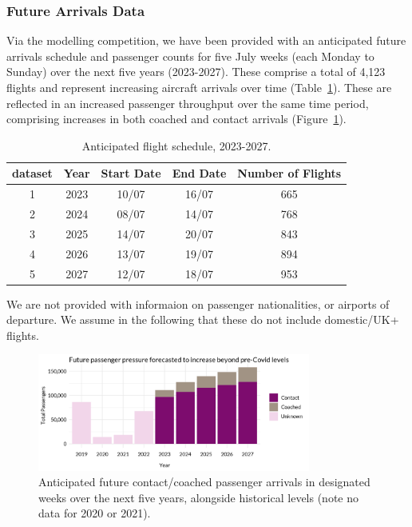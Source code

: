 \documentclass[10pt]{article}
\begin{document}
\subsubsection{Future Arrivals Data} \label{sec:future_arrivals_data}
Via the modelling competition, we have been provided with an anticipated future arrivals schedule and passenger counts for five July weeks (each Monday to Sunday) over the next five years (2023-2027). These comprise a total of 4,123 flights and represent increasing aircraft arrivals over time (Table~\ref{tab:future_arrivals_overview}). These are reflected in an increased passenger throughput over the same time period, comprising increases in both coached and contact arrivals (Figure~\ref{fig:future_passenger_burden}).
\begin{table}[!ht]
\caption{Anticipated flight schedule, 2023-2027.}
\label{tab:future_arrivals_overview}
\centering
\begin{tabular}{ccccc}
\hline
\multicolumn{1}{c}{\textbf{dataset}} & \textbf{Year} & \textbf{Start Date} & \textbf{End Date} & \textbf{Number of Flights} \\ \hline
1  & 2023  & 10/07  & 16/07     & 665   \\
2  & 2024  & 08/07  & 14/07     & 768   \\
3  & 2025  & 14/07  & 20/07     & 843   \\
4  & 2026  & 13/07  & 19/07     & 894   \\
5  & 2027  & 12/07  & 18/07     & 953   \\ \hline
\end{tabular}
\end{table}
We are not provided with informaion on passenger nationalities, or airports of departure. We assume in the following that these do not include domestic/UK+ flights. 

\begin{figure}[!ht]
    \centering
    \includegraphics[width=0.8\textwidth]{figures/future_passenger_burden_fig.png}
     \caption{Anticipated future contact/coached passenger arrivals in designated weeks over the next five years, alongside historical levels (note no data for 2020 or 2021).} \label{fig:future_passenger_burden}
\end{figure}
\end{document}
